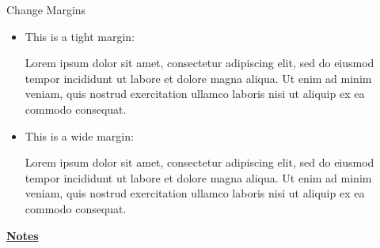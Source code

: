 \documentclass[10pt]{beamer}
\begin{document}
\begin{frame}
    {Change Margins}
    \begin{itemize}
        \item This is a tight margin:  
        \begin{changemargin}{2cm}{2cm}
            Lorem ipsum dolor sit amet, consectetur adipiscing elit, sed do eiusmod tempor incididunt ut labore et dolore magna aliqua. Ut enim ad minim veniam, quis nostrud exercitation ullamco laboris nisi ut aliquip ex ea commodo consequat. 
        \end{changemargin}\bigskip
        \item This is a wide margin:  
        \begin{changemargin}{-0.4cm}{-0.4cm}
            Lorem ipsum dolor sit amet, consectetur adipiscing elit, sed do eiusmod tempor incididunt ut labore et dolore magna aliqua. Ut enim ad minim veniam, quis nostrud exercitation ullamco laboris nisi ut aliquip ex ea commodo consequat. 
        \end{changemargin}
    \end{itemize}
\end{frame}
\begin{flushleft}
    \underline{\textbf{Notes}}\setlength{\parskip}{.15cm}\notesize\newline\par
\end{flushleft}

    
    
    
    
\end{document}
